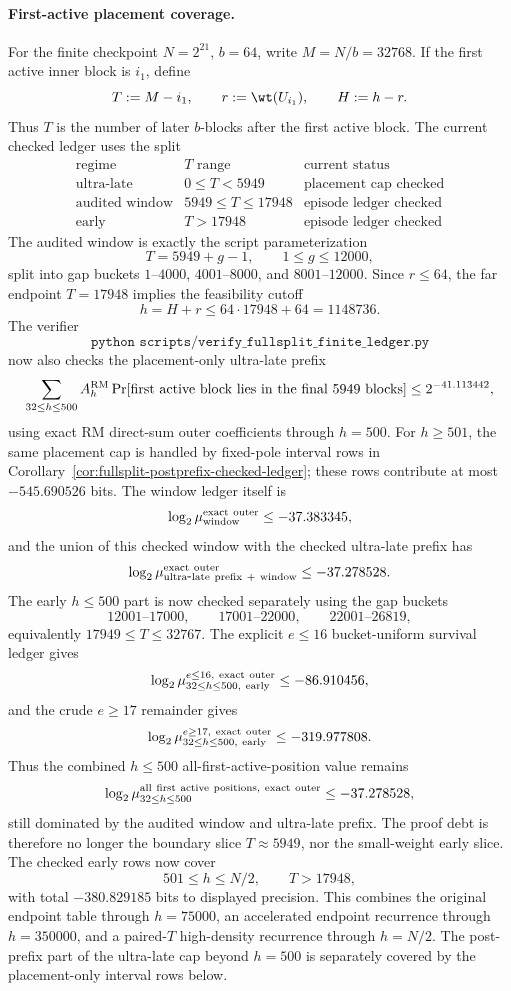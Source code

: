 \paragraph{First-active placement coverage.}
For the finite checkpoint \(N=2^{21}\), \(b=64\), write \(M=N/b=32768\).  If the first active inner block is
\(i_1\), define
\[
T:=M-i_1,\qquad r:=\wt(U_{i_1}),\qquad H:=h-r.
\]
Thus \(T\) is the number of later \(b\)-blocks after the first active block.  The current checked ledger uses the split
\[
\begin{array}{c|c|c}
\text{regime} & T\text{ range} & \text{current status}\\
\hline
\text{ultra-late} & 0\le T<5949 & \text{placement cap checked}\\
\text{audited window} & 5949\le T\le17948 & \text{episode ledger checked}\\
\text{early} & T>17948 & \text{episode ledger checked}
\end{array}
\]
The audited window is exactly the script parameterization
\[
T=5949+g-1,\qquad 1\le g\le12000,
\]
split into gap buckets \(1\text{--}4000\), \(4001\text{--}8000\), and \(8001\text{--}12000\).  Since \(r\le64\), the
far endpoint \(T=17948\) implies the feasibility cutoff
\[
h=H+r\le 64\cdot17948+64=1148736.
\]
The verifier
\[
\texttt{python scripts/verify\_fullsplit\_finite\_ledger.py}
\]
now also checks the placement-only ultra-late prefix
\[
\sum_{32\le h\le500} A_h^{\rm RM}
\Pr[\text{first active block lies in the final }5949\text{ blocks}]
\le 2^{-41.113442},
\]
using exact RM direct-sum outer coefficients through \(h=500\).  For \(h\ge501\), the same placement cap is handled by
fixed-pole interval rows in Corollary~\ref{cor:fullsplit-postprefix-checked-ledger}; these rows contribute at most
\(-545.690526\) bits.  The window ledger itself is
\[
\log_2\mu_{\rm window}^{\rm exact\ outer}\le -37.383345,
\]
and the union of this checked window with the checked ultra-late prefix has
\[
\log_2\mu_{\rm ultra\mbox{-}late\ prefix\ +\ window}^{\rm exact\ outer}\le -37.278528.
\]
The early \(h\le500\) part is now checked separately using the gap buckets
\[
12001\text{--}17000,\qquad 17001\text{--}22000,\qquad 22001\text{--}26819,
\]
equivalently \(17949\le T\le32767\).  The explicit \(e\le16\) bucket-uniform survival ledger gives
\[
\log_2\mu_{32\le h\le500,\ {\rm early}}^{e\le16,\ {\rm exact\ outer}}\le -86.910456,
\]
and the crude \(e\ge17\) remainder gives
\[
\log_2\mu_{32\le h\le500,\ {\rm early}}^{e\ge17,\ {\rm exact\ outer}}\le -319.977808.
\]
Thus the combined \(h\le500\) all-first-active-position value remains
\[
\log_2\mu_{32\le h\le500}^{\rm all\ first\ active\ positions,\ exact\ outer}\le -37.278528,
\]
still dominated by the audited window and ultra-late prefix.  The proof debt is therefore no longer the boundary slice
\(T\approx5949\), nor the small-weight early slice.  The checked early rows now cover
\[
501\le h\le N/2,\qquad T>17948,
\]
with total \(-380.829185\) bits to displayed precision.  This combines the original endpoint table through
\(h=75000\), an accelerated endpoint recurrence through \(h=350000\), and a paired-\(T\) high-density recurrence
through \(h=N/2\).  The post-prefix part of the ultra-late cap beyond \(h=500\) is separately covered by the
placement-only interval rows below.

